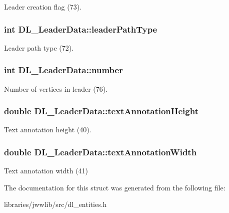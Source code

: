 Leader creation flag (73). \hypertarget{structDL__LeaderData_a15f9bd64a8e0798c80466edc9d8342df}{
\subsubsection[{leader\-Path\-Type}]{\setlength{\rightskip}{0pt plus 5cm}int D\-L\-\_\-\-Leader\-Data\-::leader\-Path\-Type}}\label{structDL__LeaderData_a15f9bd64a8e0798c80466edc9d8342df}
Leader path type (72). \hypertarget{structDL__LeaderData_a5566b3ed80917edc0fe31fb01e2de95e}{
\subsubsection[{number}]{\setlength{\rightskip}{0pt plus 5cm}int D\-L\-\_\-\-Leader\-Data\-::number}}\label{structDL__LeaderData_a5566b3ed80917edc0fe31fb01e2de95e}
Number of vertices in leader (76). \hypertarget{structDL__LeaderData_a9d37c08e1ca3b03059006a126ab55103}{
\subsubsection[{text\-Annotation\-Height}]{\setlength{\rightskip}{0pt plus 5cm}double D\-L\-\_\-\-Leader\-Data\-::text\-Annotation\-Height}}\label{structDL__LeaderData_a9d37c08e1ca3b03059006a126ab55103}
Text annotation height (40). \hypertarget{structDL__LeaderData_ad5f09431f77788116475bd5ec83ce6ba}{
\subsubsection[{text\-Annotation\-Width}]{\setlength{\rightskip}{0pt plus 5cm}double D\-L\-\_\-\-Leader\-Data\-::text\-Annotation\-Width}}\label{structDL__LeaderData_ad5f09431f77788116475bd5ec83ce6ba}
Text annotation width (41) 

The documentation for this struct was generated from the following file\-:\begin{DoxyCompactItemize}
\item 
libraries/jwwlib/src/dl\-\_\-entities.\-h\end{DoxyCompactItemize}
